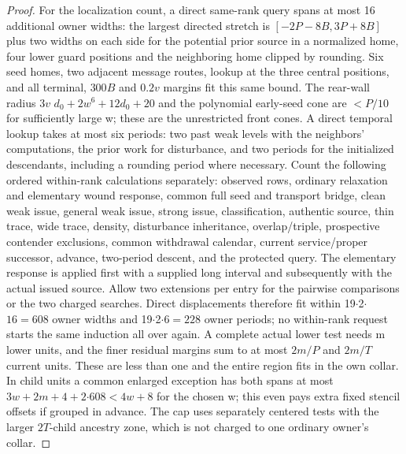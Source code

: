 \begin{proof}
For the localization count, a direct same-rank query spans at most 16 additional owner widths: the largest directed stretch is \([- 2P- 8B,3P+8B]\) plus two widths on each side for the potential prior source in a normalized home, four lower guard positions and the neighboring home clipped by rounding. Six seed homes, two adjacent message routes, lookup at the three central positions, and all terminal, \(300B\) and \(0.2v\) margins fit this same bound. The rear-wall radius \(3v\) \(d_0+2w^6+12d_0+20\) and the polynomial early-seed cone are \(<P/10\) for sufficiently large w; these are the unrestricted front cones. A direct temporal lookup takes at most six periods: two past weak levels with the neighbors' computations, the prior work for disturbance, and two periods for the initialized descendants, including a rounding period where necessary. Count the following ordered within-rank calculations separately: observed rows, ordinary relaxation and elementary wound response, common full seed and transport bridge, clean weak issue, general weak issue, strong issue, classification, authentic source, thin trace, wide trace, density, disturbance inheritance, overlap/triple, prospective contender exclusions, common withdrawal calendar, current service/proper successor, advance, two-period descent, and the protected query. The elementary response is applied first with a supplied long interval and subsequently with the actual issued source. Allow two extensions per entry for the pairwise comparisons or the two charged searches. Direct displacements therefore fit within 19\(\cdot\)2\(\cdot\)\(16=608\) owner widths and 19\(\cdot\)2\(\cdot\)\(6=228\) owner periods; no within-rank request starts the same induction all over again. A complete actual lower test needs m lower units, and the finer residual margins sum to at most \(2m/P\) and \(2m/T\) current units. These are less than one and the entire region fits in the own collar. In child units a common enlarged exception has both spans at most \(3w+2m+4+2\)\(\cdot\)\(608<4w+8\) for the chosen w; this even pays extra fixed stencil offsets if grouped in advance. The cap uses separately centered tests with the larger \(2T\)-child ancestry zone, which is not charged to one ordinary owner's collar.
\end{proof}

